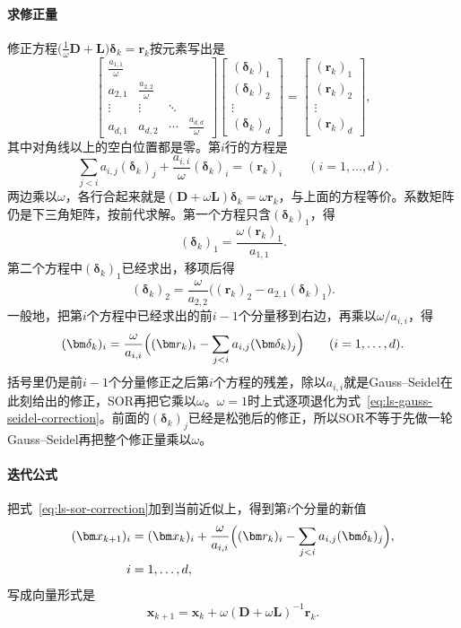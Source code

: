 \paragraph{求修正量}
修正方程$\bigl(\frac1\omega\bm D+\bm L\bigr)\bm\delta_k=\bm r_k$按元素写出是
\[
 \begin{bmatrix}\frac{a_{1,1}}{\omega}&&&\\a_{2,1}&\frac{a_{2,2}}{\omega}&&\\\vdots&\vdots&\ddots&\\a_{d,1}&a_{d,2}&\cdots&\frac{a_{d,d}}{\omega}\end{bmatrix}
 \begin{bmatrix}(\bm\delta_k)_1\\(\bm\delta_k)_2\\\vdots\\(\bm\delta_k)_d\end{bmatrix}
 =\begin{bmatrix}(\bm r_k)_1\\(\bm r_k)_2\\\vdots\\(\bm r_k)_d\end{bmatrix},
\]
其中对角线以上的空白位置都是零。第$i$行的方程是
\[
 \sum_{j<i}a_{i,j}(\bm\delta_k)_j+\frac{a_{i,i}}{\omega}(\bm\delta_k)_i=(\bm r_k)_i\qquad(i=1,\ldots,d).
\]
两边乘以$\omega$，各行合起来就是$(\bm D+\omega\bm L)\bm\delta_k=\omega\bm r_k$，与上面的方程等价。系数矩阵仍是下三角矩阵，按前代求解。第一个方程只含$(\bm\delta_k)_1$，得
\[
 (\bm\delta_k)_1=\frac{\omega(\bm r_k)_1}{a_{1,1}} .
\]
第二个方程中$(\bm\delta_k)_1$已经求出，移项后得
\[
 (\bm\delta_k)_2=\frac{\omega}{a_{2,2}}\bigl((\bm r_k)_2-a_{2,1}(\bm\delta_k)_1\bigr) .
\]
一般地，把第$i$个方程中已经求出的前$i-1$个分量移到右边，再乘以$\omega/a_{i,i}$，得
\begin{equation}
 (\bm\delta_k)_i=\frac{\omega}{a_{i,i}}\Bigl((\bm r_k)_i-\sum_{j<i}a_{i,j}(\bm\delta_k)_j\Bigr)\qquad(i=1,\ldots,d).
 \label{eq:ls-sor-correction}
\end{equation}
括号里仍是前$i-1$个分量修正之后第$i$个方程的残差，除以$a_{i,i}$就是Gauss--Seidel在此刻给出的修正，SOR再把它乘以$\omega$。$\omega=1$时上式逐项退化为式~\eqref{eq:ls-gauss-seidel-correction}。前面的$(\bm\delta_k)_j$已经是松弛后的修正，所以SOR不等于先做一轮Gauss--Seidel再把整个修正量乘以$\omega$。

\paragraph{迭代公式}
把式~\eqref{eq:ls-sor-correction}加到当前近似上，得到第$i$个分量的新值
\begin{equation}
 \begin{aligned}
 (\bm x_{k+1})_i&=(\bm x_k)_i+\frac{\omega}{a_{i,i}}\Bigl((\bm r_k)_i-\sum_{j<i}a_{i,j}(\bm\delta_k)_j\Bigr),\\
 i&=1,\ldots,d,
 \end{aligned}
 \label{eq:ls-sor-update}
\end{equation}
写成向量形式是
\[
 \bm x_{k+1}=\bm x_k+\omega(\bm D+\omega\bm L)^{-1}\bm r_k .
\]

